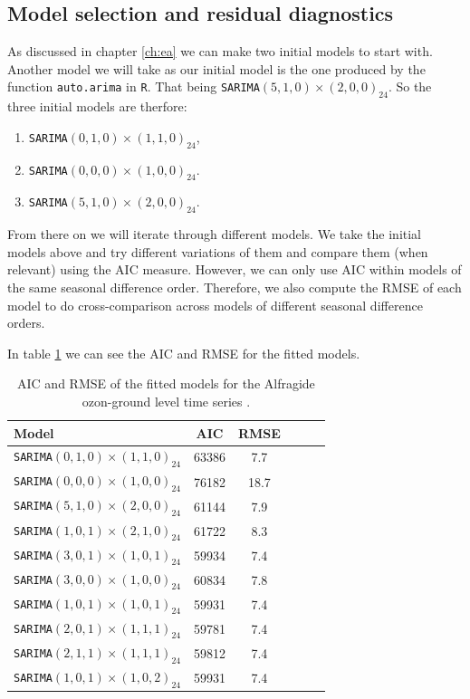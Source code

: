 \documentclass{article}
\begin{document}
\subsection{Model selection and residual diagnostics}

As discussed in chapter \ref{ch:ea} we can make two initial models to start with. Another model we will take as our initial model is the one produced by the function \verb|auto.arima| in \verb|R|. That being 
\verb|SARIMA|$(5,1,0) \times (2,0,0)_{24}$. So the three initial models are therfore:
\begin{enumerate}
    \item \verb|SARIMA|$(0,1,0) \times (1,1,0)_{24}$,
    \item \verb|SARIMA|$(0,0,0) \times (1,0,0)_{24}$.
    \item \verb|SARIMA|$(5,1,0) \times (2,0,0)_{24}$.
\end{enumerate}

From there on we will iterate through different models. We take the initial models above and try different variations of them and compare them (when relevant) using the AIC measure. However, we can only use AIC within models of the same seasonal
difference order. Therefore, we also compute the RMSE of each model to do cross-comparison across models of different seasonal difference orders. 

In table \ref{model:ozon} we can see the AIC and RMSE for the fitted models.

\begin{table}[htbp]
  \centering
  \begin{tabular}{lccccc}
    \toprule
    \textbf{Model} & \textbf{AIC} & \textbf{RMSE} \\
    \midrule
    \verb|SARIMA|$(0,1,0) \times (1,1,0)_{24}$&  63386 & 7.7 \\ \hline 
    \verb|SARIMA|$(0,0,0) \times (1,0,0)_{24}$  & 76182 & 18.7  \\ \hline
    \verb|SARIMA|$(5,1,0) \times (2,0,0)_{24}$ & 61144 & 7.9  \\ \hline
    \verb|SARIMA|$(1,0,1) \times (2,1,0)_{24}$ & 61722 & 8.3  \\ \hline
    \verb|SARIMA|$(3,0,1) \times (1,0,1)_{24}$ & 59934 & 7.4  \\ \hline
    \verb|SARIMA|$(3,0,0) \times (1,0,0)_{24}$ & 60834 & 7.8  \\ \hline
    \verb|SARIMA|$(1,0,1) \times (1,0,1)_{24}$ & 59931 & 7.4  \\ \hline
    \verb|SARIMA|$(2,0,1) \times (1,1,1)_{24}$ & 59781 & 7.4  \\ \hline
    \verb|SARIMA|$(2,1,1) \times (1,1,1)_{24}$ & 59812 & 7.4  \\ \hline
    \verb|SARIMA|$(1,0,1) \times (1,0,2)_{24}$ & 59931 & 7.4  \\ 
    \bottomrule
  \end{tabular}
  \caption{AIC and RMSE of the fitted models for the Alfragide ozon-ground level time series .}
  \label{model:ozon}
\end{table}
\end{document}
